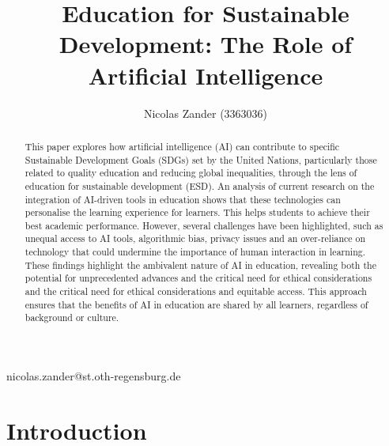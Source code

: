 \documentclass[]{lni}
\begin{document}
\title[]{Education for Sustainable Development: The Role of Artificial Intelligence}


\author[1]{Nicolas Zander (3363036)}{nicolas.zander@st.oth-regensburg.de}{}

\maketitle

\begin{abstract}

This paper explores how artificial intelligence (AI) can contribute to specific Sustainable Development Goals (SDGs) set by the United Nations, 
particularly those related to quality education and reducing global inequalities, through the lens of education for sustainable development (ESD).
An analysis of current research on the integration of AI-driven tools in education shows that these technologies can personalise the learning experience for learners. 
This helps students to achieve their best academic performance. However, several challenges have been highlighted,
such as unequal access to AI tools, algorithmic bias, privacy issues and an over-reliance on technology that could undermine the importance of human interaction in learning. 
These findings highlight the ambivalent nature of AI in education, revealing both the potential for unprecedented advances and the critical need for ethical considerations and
the critical need for ethical considerations and equitable access. This approach ensures that the benefits of AI in education are shared by all learners, 
regardless of background or culture.

\end{abstract}



\section{Introduction}
\end{document}
